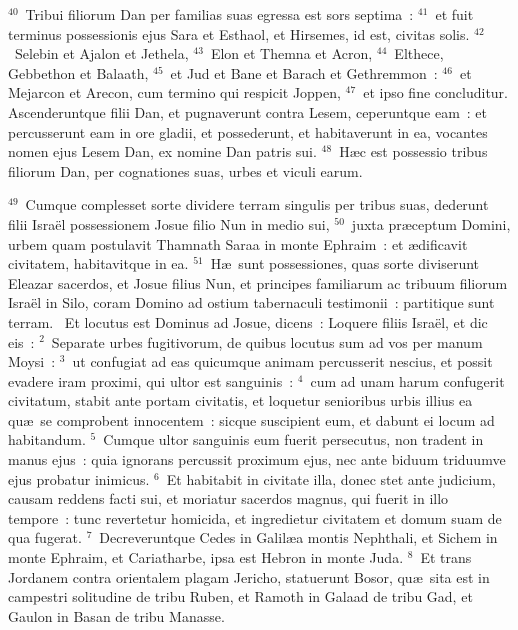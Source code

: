 ${}^{40}$~Tribui filiorum Dan per familias suas egressa est sors septima~:
${}^{41}$~et fuit terminus possessionis ejus Sara et Esthaol, et Hirsemes, id est, civitas solis.
${}^{42}$~Selebin et Ajalon et Jethela,
${}^{43}$~Elon et Themna et Acron,
${}^{44}$~Elthece, Gebbethon et Balaath,
${}^{45}$~et Jud et Bane et Barach et Gethremmon~:
${}^{46}$~et Mejarcon et Arecon, cum termino qui respicit Joppen,
${}^{47}$~et ipso fine concluditur. Ascenderuntque filii Dan, et pugnaverunt contra Lesem, ceperuntque eam~: et percusserunt eam in ore gladii, et possederunt, et habitaverunt in ea, vocantes nomen ejus Lesem Dan, ex nomine Dan patris sui.
${}^{48}$~H\ae c est possessio tribus filiorum Dan, per cognationes suas, urbes et viculi earum.


${}^{49}$~Cumque complesset sorte dividere terram singulis per tribus suas, dederunt filii Isra\"el possessionem Josue filio Nun in medio sui,
${}^{50}$~juxta pr\ae ceptum Domini, urbem quam postulavit Thamnath Saraa in monte Ephraim~: et \ae dificavit civitatem, habitavitque in ea.
${}^{51}$~H\ae\ sunt possessiones, quas sorte diviserunt Eleazar sacerdos, et Josue filius Nun, et principes familiarum ac tribuum filiorum Isra\"el in Silo, coram Domino ad ostium tabernaculi testimonii~: partitique sunt terram.
~\lettrine[lines=10,image=true,loversize=0.05,lraise=-0.03]{E}{}t locutus est Dominus ad Josue, dicens~: Loquere filiis Isra\"el, et dic eis~:
${}^{2}$~Separate urbes fugitivorum, de quibus locutus sum ad vos per manum Moysi~:
${}^{3}$~ut confugiat ad eas quicumque animam percusserit nescius, et possit evadere iram proximi, qui ultor est sanguinis~:
${}^{4}$~cum ad unam harum confugerit civitatum, stabit ante portam civitatis, et loquetur senioribus urbis illius ea qu\ae\ se comprobent innocentem~: sicque suscipient eum, et dabunt ei locum ad habitandum.
${}^{5}$~Cumque ultor sanguinis eum fuerit persecutus, non tradent in manus ejus~: quia ignorans percussit proximum ejus, nec ante biduum triduumve ejus probatur inimicus.
${}^{6}$~Et habitabit in civitate illa, donec stet ante judicium, causam reddens facti sui, et moriatur sacerdos magnus, qui fuerit in illo tempore~: tunc revertetur homicida, et ingredietur civitatem et domum suam de qua fugerat.
${}^{7}$~Decreveruntque Cedes in Galil\ae a montis Nephthali, et Sichem in monte Ephraim, et Cariatharbe, ipsa est Hebron in monte Juda.
${}^{8}$~Et trans Jordanem contra orientalem plagam Jericho, statuerunt Bosor, qu\ae\ sita est in campestri solitudine de tribu Ruben, et Ramoth in Galaad de tribu Gad, et Gaulon in Basan de tribu Manasse.
